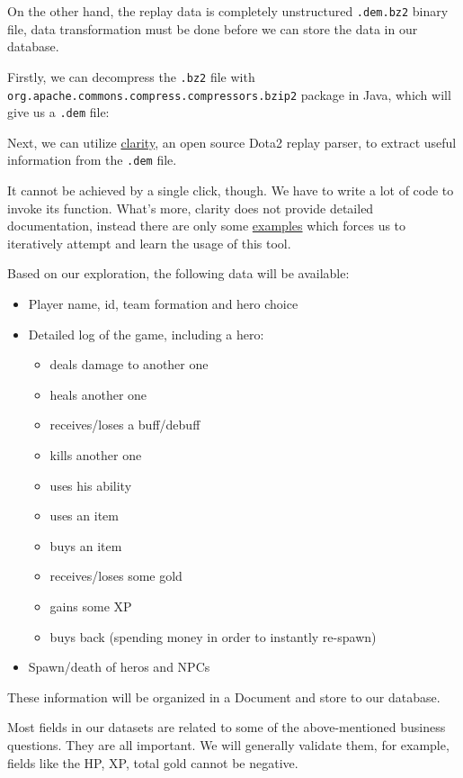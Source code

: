 \documentclass{article}
\newcommand{\codeinline}[1]{
	\texttt{#1}
}
\begin{document}
On the other hand, the replay data is completely unstructured \codeinline{.dem.bz2} binary file,
data transformation must be done before we can store the data in our database.

Firstly, we can decompress the \codeinline{.bz2} file with \codeinline{org.apache.commons.compress.compressors.bzip2} package in Java,
which will give us a \codeinline{.dem} file:

Next, we can utilize \href{https://github.com/skadistats/clarity}{clarity},
an open source Dota2 replay parser, to extract useful information from the \codeinline{.dem} file.

It cannot be achieved by a single click, though. We have to write a lot of code to invoke its function.
What's more, clarity does not provide detailed documentation, instead there are only some \href{https://github.com/skadistats/clarity-examples}{examples} which forces us to iteratively attempt and learn the usage of this tool.

Based on our exploration, the following data will be available:

\begin{itemize}
	\item Player name, id, team formation and hero choice
	\item Detailed log of the game, including a hero:
	\begin{itemize}
		\item deals damage to another one
		\item heals another one
		\item receives/loses a \gls{buff}/\gls{debuff}
		\item kills another one
		\item uses his ability
		\item uses an item
		\item buys an item
		\item receives/loses some \gls{gold}
		\item gains some \gls{XP}
		\item buys back (spending money in order to instantly re-spawn)
	\end{itemize}
	\item Spawn/death of heros and NPCs
\end{itemize}

These information will be organized in a Document and store to our database.

Most fields in our datasets are related to some of the above-mentioned business questions.
They are all important.
We will generally validate them, for example, fields like the HP, XP, total gold cannot be negative.
\end{document}
